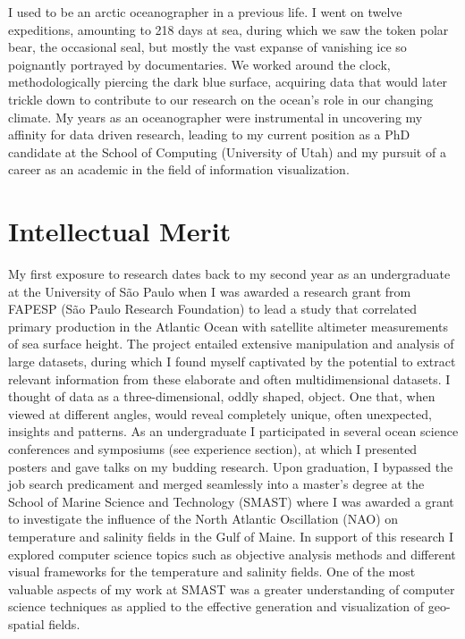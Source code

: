 \documentclass[timesfont,runinheadings]{nsfgrfp}
\begin{document}

I used to be an arctic oceanographer in a previous life. I went on twelve expeditions, amounting to 218 days at sea, during which we saw the token polar bear, the occasional seal, but mostly the vast expanse of vanishing ice so poignantly portrayed by documentaries. We worked around the clock, methodologically piercing the dark blue surface, acquiring data that would later trickle down to contribute to our research on the ocean's role in our changing climate. My years as an oceanographer were instrumental in uncovering my affinity for data driven research, leading to my current position as a PhD candidate at the School of Computing (University of Utah) and my pursuit of a career as an academic in the field of information visualization. 

\section*{Intellectual Merit}
My first exposure to research dates back to my second year as an undergraduate at the University of S\~ao Paulo when I was awarded a research grant from FAPESP (S\~ao Paulo Research Foundation) to lead a study that correlated primary production in the Atlantic Ocean with satellite altimeter measurements of sea surface height. The project entailed extensive manipulation and analysis of large datasets, during which I found myself captivated by the potential to extract relevant information from these elaborate and often multidimensional datasets. I thought of data as a three-dimensional, oddly shaped, object. One that, when viewed at different angles, would reveal completely unique, often unexpected, insights and patterns. As an undergraduate I participated in several ocean science conferences and symposiums (see experience section), at which I presented posters and gave talks on my budding research. Upon graduation, I bypassed the job search predicament and merged seamlessly into a master’s degree at the School of Marine Science and Technology (SMAST) where I was awarded a grant to investigate the influence of the North Atlantic Oscillation (NAO) on temperature and salinity fields in the Gulf of Maine. In support of this research I explored computer science topics such as objective analysis methods and different visual frameworks for the temperature and salinity fields. One of the most valuable aspects of my work at SMAST was a greater understanding of computer science techniques as applied to the effective generation and visualization of geo-spatial fields.
\end{document}
